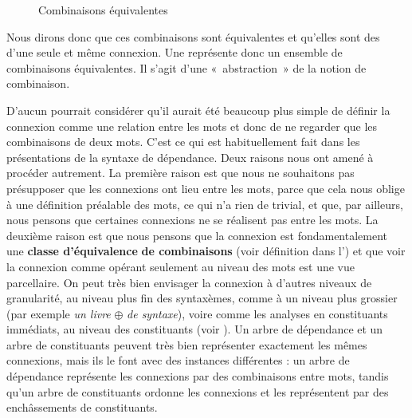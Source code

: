 \begin{figure}

\caption{\label{fig:}Combinaisons équivalentes}
\end{figure}

\begin{styleLivreImportant}
Nous dirons donc que ces combinaisons sont équivalentes et qu’elles sont des  d’une seule et même connexion. Une  représente donc un ensemble de combinaisons équivalentes. Il s’agit d’une «~abstraction~» de la notion de combinaison.
\end{styleLivreImportant}

D’aucun pourrait considérer qu’il aurait été beaucoup plus simple de définir la connexion comme une relation entre les mots et donc de ne regarder que les combinaisons de deux mots. C’est ce qui est habituellement fait dans les présentations de la syntaxe de dépendance. Deux raisons nous ont amené à procéder autrement. La première raison est que nous ne souhaitons pas présupposer que les connexions ont lieu entre les mots, parce que cela nous oblige à une définition préalable des mots, ce qui n’a rien de trivial, et que, par ailleurs, nous pensons que certaines connexions ne se réalisent pas entre les mots. La deuxième raison est que nous pensons que la connexion est fondamentalement une \textbf{classe d’équivalence} \textbf{de combinaisons} (voir définition dans l’) et que voir la connexion comme opérant seulement au niveau des mots est une vue parcellaire. On peut très bien envisager la connexion à d’autres niveaux de granularité, au niveau plus fin des syntaxèmes, comme à un niveau plus grossier (par exemple \textit{un livre} ${\oplus}$ \textit{de syntaxe}), voire comme les analyses en constituants immédiats, au niveau des constituants (voir ). Un arbre de dépendance et un arbre de constituants peuvent très bien représenter exactement les mêmes connexions, mais ils le font avec des instances différentes : un arbre de dépendance représente les connexions par des combinaisons entre mots, tandis qu’un arbre de constituants ordonne les connexions et les représentent par des enchâssements de constituants.

